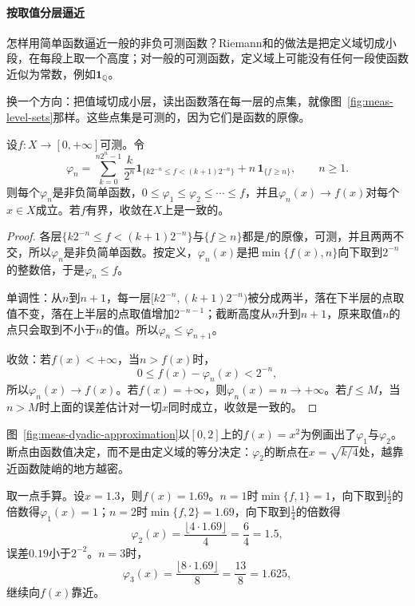\paragraph{按取值分层逼近}
怎样用简单函数逼近一般的非负可测函数？Riemann和的做法是把定义域切成小段，在每段上取一个高度；对一般的可测函数，定义域上可能没有任何一段使函数近似为常数，例如$\mathbf 1_{\mathbb Q}$。

换一个方向：把值域切成小层，读出函数落在每一层的点集，就像图~\ref{fig:meas-level-sets}那样。这些点集是可测的，因为它们是函数的原像。

\begin{theorem}[简单函数逼近]
\label{thm:meas-simple-approximation}
设$f:X\to[0,+\infty]$可测。令
\begin{equation}
 \varphi_n=\sum_{k=0}^{n2^n-1}\frac k{2^n}\mathbf 1_{\{k2^{-n}\leq f<(k+1)2^{-n}\}}+n\,\mathbf 1_{\{f\geq n\}},\qquad n\geq1.
 \label{eq:meas-dyadic-approximation}
\end{equation}
则每个$\varphi_n$是非负简单函数，$0\leq\varphi_1\leq\varphi_2\leq\cdots\leq f$，并且$\varphi_n(x)\to f(x)$对每个$x\in X$成立。若$f$有界，收敛在$X$上是一致的。
\end{theorem}

\begin{proof}
各层$\{k2^{-n}\leq f<(k+1)2^{-n}\}$与$\{f\geq n\}$都是$f$的原像，可测，并且两两不交，所以$\varphi_n$是非负简单函数。按定义，$\varphi_n(x)$是把$\min\{f(x),n\}$向下取到$2^{-n}$的整数倍，于是$\varphi_n\leq f$。

单调性：从$n$到$n+1$，每一层$[k2^{-n},(k+1)2^{-n})$被分成两半，落在下半层的点取值不变，落在上半层的点取值增加$2^{-n-1}$；截断高度从$n$升到$n+1$，原来取值$n$的点只会取到不小于$n$的值。所以$\varphi_n\leq\varphi_{n+1}$。

收敛：若$f(x)<+\infty$，当$n>f(x)$时，
\[
 0\leq f(x)-\varphi_n(x)<2^{-n},
\]
所以$\varphi_n(x)\to f(x)$。若$f(x)=+\infty$，则$\varphi_n(x)=n\to+\infty$。若$f\leq M$，当$n>M$时上面的误差估计对一切$x$同时成立，收敛是一致的。
\end{proof}

图~\ref{fig:meas-dyadic-approximation}以$[0,2]$上的$f(x)=x^2$为例画出了$\varphi_1$与$\varphi_2$。断点由函数值决定，而不是由定义域的等分决定：$\varphi_2$的断点在$x=\sqrt{k/4}$处，越靠近函数陡峭的地方越密。

取一点手算。设$x=1.3$，则$f(x)=1.69$。$n=1$时$\min\{f,1\}=1$，向下取到$\tfrac12$的倍数得$\varphi_1(x)=1$；$n=2$时$\min\{f,2\}=1.69$，向下取到$\tfrac14$的倍数得
\[
 \varphi_2(x)=\frac{\lfloor 4\cdot1.69\rfloor}{4}=\frac64=1.5,
\]
误差$0.19$小于$2^{-2}$。$n=3$时，
\[
 \varphi_3(x)=\frac{\lfloor8\cdot1.69\rfloor}8=\frac{13}8=1.625,
\]
继续向$f(x)$靠近。

